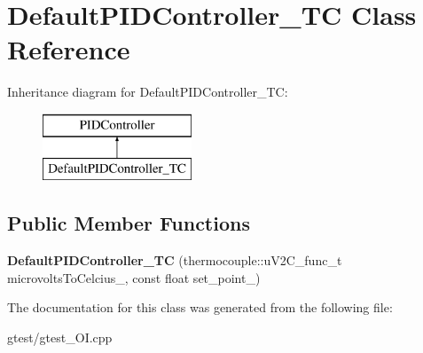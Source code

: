 \hypertarget{class_default_p_i_d_controller___t_c}{\section{Default\-P\-I\-D\-Controller\-\_\-\-T\-C Class Reference}
\label{class_default_p_i_d_controller___t_c}
}
Inheritance diagram for Default\-P\-I\-D\-Controller\-\_\-\-T\-C\-:\begin{figure}[H]
\begin{center}
\leavevmode
\includegraphics[height=2.000000cm]{class_default_p_i_d_controller___t_c}
\end{center}
\end{figure}
\subsection*{Public Member Functions}
\begin{DoxyCompactItemize}
\item 
\hypertarget{class_default_p_i_d_controller___t_c_aac6f97abe5d3a9af2ec6f00bea8a484a}{{\bfseries Default\-P\-I\-D\-Controller\-\_\-\-T\-C} (thermocouple\-::u\-V2\-C\-\_\-func\-\_\-t microvolts\-To\-Celcius\-\_\-, const float set\-\_\-point\-\_\-)}\label{class_default_p_i_d_controller___t_c_aac6f97abe5d3a9af2ec6f00bea8a484a}

\end{DoxyCompactItemize}


The documentation for this class was generated from the following file\-:\begin{DoxyCompactItemize}
\item 
gtest/gtest\-\_\-\-O\-I.\-cpp\end{DoxyCompactItemize}
